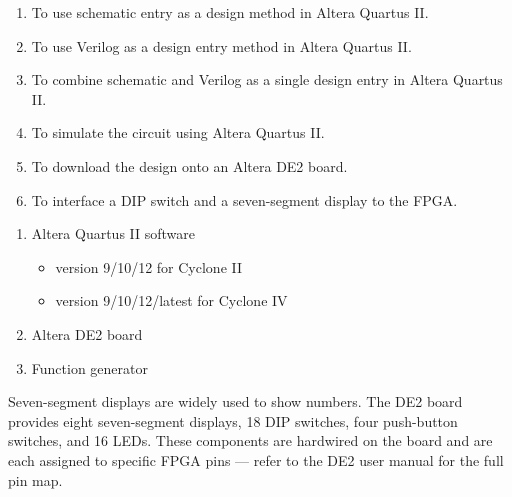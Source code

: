 
\begin{objectives}
  \begin{enumerate}
    \item To use schematic entry as a design method in Altera Quartus II.
    \item To use Verilog as a design entry method in Altera Quartus II.
    \item To combine schematic and Verilog as a single design entry in Altera Quartus II.
    \item To simulate the circuit using Altera Quartus II.
    \item To download the design onto an Altera DE2 board.
    \item To interface a DIP switch and a seven-segment display to the FPGA.
  \end{enumerate}
\end{objectives}

\begin{equipment}
  \begin{enumerate}
    \item Altera Quartus II software
          \begin{itemize}
            \item version 9/10/12 for Cyclone II
            \item version 9/10/12/latest for Cyclone IV
          \end{itemize}
    \item Altera DE2 board
    \item Function generator
  \end{enumerate}
\end{equipment}

\begin{introduction}
  Seven-segment displays are widely used to show numbers. The DE2 board provides eight seven-segment displays, 18 DIP switches, four push-button switches, and 16 LEDs. These components are hardwired on the board and are each assigned to specific FPGA pins --- refer to the DE2 user manual for the full pin map.
\end{introduction}


